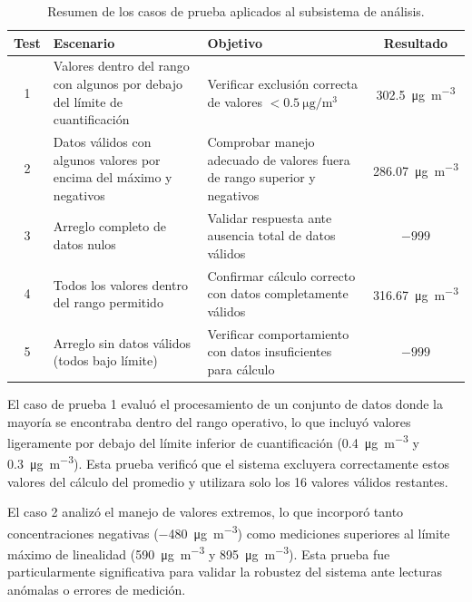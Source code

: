 \begin{table}[h]
	\centering
	\small
	\caption{Resumen de los casos de prueba aplicados al subsistema de análisis.}
	\label{tab:casos-prueba-software}
	\begin{tabular}{c p{4.5cm} p{4.5cm} c }
		\hline
		\textbf{Test} & \textbf{Escenario} & \textbf{Objetivo} & \textbf{Resultado} \\
		\hline
		1 & Valores dentro del rango con algunos por debajo del límite de cuantificación & Verificar exclusión correcta de valores $< \SI{0.5}{\micro\gram\per\cubic\meter}$ & \SI{302.5}{\micro\gram\per\cubic\meter} \\
		
		2 & Datos válidos con algunos valores por encima del máximo y negativos & Comprobar manejo adecuado de valores fuera de rango superior y negativos & \SI{286.07}{\micro\gram\per\cubic\meter} \\
		
		3 & Arreglo completo de datos nulos & Validar respuesta ante ausencia total de datos válidos & $-999$ \\
		
		4 & Todos los valores dentro del rango permitido & Confirmar cálculo correcto con datos completamente válidos & \SI{316.67}{\micro\gram\per\cubic\meter} \\
		
		5 & Arreglo sin datos válidos (todos bajo límite) & Verificar comportamiento con datos insuficientes para cálculo & $-999$ \\
		\hline
	\end{tabular}
\end{table}

El caso de prueba 1 evaluó el procesamiento de un conjunto de datos donde la mayoría se encontraba dentro del rango operativo, lo que incluyó valores ligeramente por debajo del límite inferior de cuantificación (\SI{0.4}{\micro\gram\per\cubic\meter} y \SI{0.3}{\micro\gram\per\cubic\meter}). Esta prueba verificó que el sistema excluyera correctamente estos valores del cálculo del promedio y utilizara solo los 16 valores válidos restantes.

El caso 2 analizó el manejo de valores extremos, lo que incorporó tanto concentraciones negativas (\SI{-480}{\micro\gram\per\cubic\meter}) como mediciones superiores al límite máximo de linealidad (\SI{590}{\micro\gram\per\cubic\meter} y \SI{895}{\micro\gram\per\cubic\meter}). Esta prueba fue particularmente significativa para validar la robustez del sistema ante lecturas anómalas o errores de medición.

